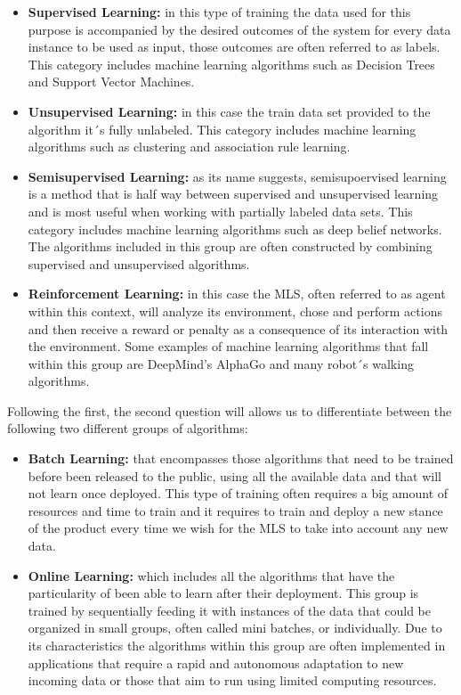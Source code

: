 \documentclass[12pt, a4paper]{article}
\begin{document}
	\begin{itemize}
	
	\item \textbf{Supervised Learning:} in this type of training the data used for this purpose is accompanied by the desired outcomes of the system for every data instance to be used as input, those outcomes are often referred to as labels. This category includes machine learning algorithms such as Decision Trees and Support Vector Machines.
	
	\item \textbf{Unsupervised Learning:} in this case the train data set provided to the algorithm it´s fully unlabeled. This category includes machine learning algorithms such as clustering and association rule learning.
	
	\item \textbf{Semisupervised Learning:} as its name suggests, semisupoervised learning is a method that is half way between supervised and unsupervised learning and is most useful when working with partially labeled data sets. This category includes machine learning algorithms such as deep belief networks. The algorithms included in this group are often constructed by combining supervised and unsupervised algorithms.
	
	\item \textbf{Reinforcement Learning:} in this case the MLS, often referred to as agent within this context, will analyze its environment, chose and perform actions and then receive a reward or penalty as a consequence of its interaction with the environment. Some examples of machine learning algorithms that fall within this group are DeepMind’s AlphaGo and many robot´s walking algorithms. 
	
	\end{itemize}

	Following the first, the second question will allows us to differentiate between the following two different groups of algorithms:
	
	\begin{itemize}
	
	\item \textbf{Batch Learning:} that encompasses those algorithms that need to be trained before been released to the public, using all the available data and that will not learn once deployed. This type of training often requires a big amount of resources and time to train and it requires to train and deploy a new stance of the product every time we wish for the MLS to take into account any new data.
	
	\item \textbf{Online Learning:} which includes all the algorithms that have the particularity of been able to learn after their deployment. This group is trained by sequentially feeding it with instances of the data that could be organized in small groups, often called mini batches, or individually. Due to its characteristics the algorithms within this group are often implemented in applications that require a rapid and autonomous adaptation to new incoming data or those that aim to run using limited computing resources.
		
	\end{itemize}
	
\end{document}
